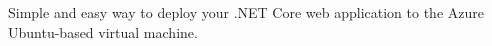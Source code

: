 Simple and easy way to deploy your .NET Core web application to the Azure Ubuntu-based virtual machine.